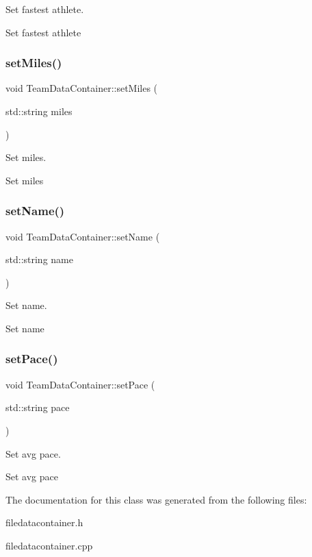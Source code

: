 Set fastest athlete. 

Set fastest athlete \mbox{\label{classTeamDataContainer_a18cfbddc60db01ad1434401a8f8c892a}} 
\subsubsection{\texorpdfstring{setMiles()}{setMiles()}}
{\footnotesize\ttfamily void Team\+Data\+Container\+::set\+Miles (\begin{DoxyParamCaption}\item[{std\+::string}]{miles }\end{DoxyParamCaption})}



Set miles. 

Set miles \mbox{\label{classTeamDataContainer_aadf07ec4e7d39230b3c5754707f40c01}} 
\subsubsection{\texorpdfstring{setName()}{setName()}}
{\footnotesize\ttfamily void Team\+Data\+Container\+::set\+Name (\begin{DoxyParamCaption}\item[{std\+::string}]{name }\end{DoxyParamCaption})}



Set name. 

Set name \mbox{\label{classTeamDataContainer_a27fea3f0b0b1ec40cb135766bf8481a4}} 
\subsubsection{\texorpdfstring{setPace()}{setPace()}}
{\footnotesize\ttfamily void Team\+Data\+Container\+::set\+Pace (\begin{DoxyParamCaption}\item[{std\+::string}]{pace }\end{DoxyParamCaption})}



Set avg pace. 

Set avg pace 

The documentation for this class was generated from the following files\+:\begin{DoxyCompactItemize}
\item 
filedatacontainer.\+h\item 
filedatacontainer.\+cpp\end{DoxyCompactItemize}
